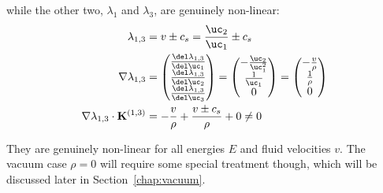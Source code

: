 while the other two, $\lambda_1$ and $\lambda_3$, are genuinely non-linear:
\begin{align}
  \lambda_{1,3} &= v \pm c_s = \frac{\uc_2}{\uc_1} \pm c_s \\
  \nabla \lambda_{1,3} &= \begin{pmatrix}
                       \frac{\del \lambda_{1,3}}{\del \uc_1} \\
                       \frac{\del \lambda_{1,3}}{\del \uc_2} \\
                       \frac{\del \lambda_{1,3}}{\del \uc_3}
                      \end{pmatrix}
                   =  \begin{pmatrix}
                        -\frac{\uc_2}{\uc_1^2} \\
                        \frac{1}{\uc_1} \\
                        0
                      \end{pmatrix}
                   =  \begin{pmatrix}
                        -\frac{v}{\rho} \\
                        \frac{1}{\rho} \\
                        0
                      \end{pmatrix}
                      \\
 \nabla \lambda_{1,3} \cdot \mathbf{K}^{(1,3)} &= -\frac{v}{\rho} + \frac{v \pm c_s}{\rho} + 0 \neq
0
\end{align}

They are genuinely non-linear for all energies $E$ and fluid velocities $v$. The vacuum case
$\rho = 0$ will require some special treatment though, which will be discussed later in
Section~\ref{chap:vacuum}.


